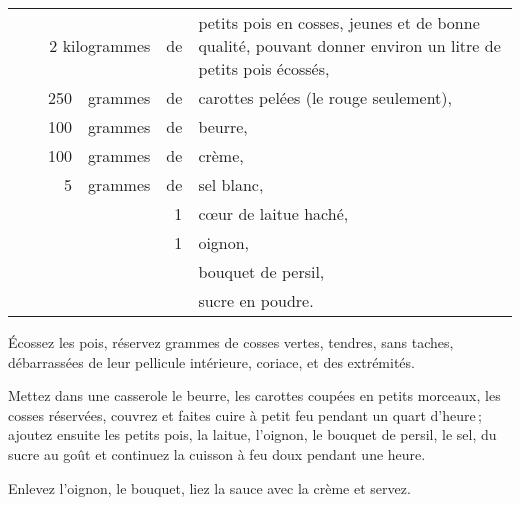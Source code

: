 \footnotesize
\begin{longtable}{rrrrrp{18em}}
  & \multicolumn{3}{r}{2 kilogrammes} & de & petits pois en cosses, jeunes et de bonne qualité,
                                            pouvant donner environ un litre de petits pois écossés,       \\
  & \hspace{2em} &  250 & grammes & de & carottes pelées (le rouge seulement),                            \\
  & \hspace{2em} &  100 & grammes & de & beurre,                                                          \\
  & \hspace{2em} &  100 & grammes & de & crème,                                                           \\
  & \hspace{2em} &    5 & grammes & de & sel blanc,                                                       \\
  & \hspace{2em} &      &         &  1 & cœur de laitue haché,                                            \\
  & \hspace{2em} &      &         &  1 & oignon,                                                          \\
  & \hspace{2em} &      &         &    & bouquet de persil,                                               \\
  & \hspace{2em} &      &         &    & sucre en poudre.                                                 \\
\end{longtable}
\normalsize

Écossez les pois, réservez {\mmm} grammes de cosses vertes, tendres,
sans taches, débarrassées de leur pellicule intérieure, coriace, et des
extrémités.

Mettez dans une casserole le beurre, les carottes coupées en petits morceaux,
les cosses réservées, couvrez et faites cuire à petit feu pendant un quart
d'heure ; ajoutez ensuite les petits pois, la laitue, l'oignon, le bouquet de
persil, le sel, du sucre au goût et continuez la cuisson à feu doux pendant une
heure.

Enlevez l'oignon, le bouquet, liez la sauce avec la crème et servez.

